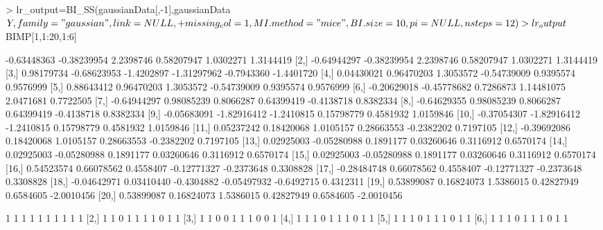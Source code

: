 \documentclass[a4paper]{article}
\begin{document}
\begin{Schunk}
\begin{Sinput}
> lr_output=BI_SS(gaussianData[,-1],gaussianData$Y,family="gaussian",link=NULL,
+                 missing_col=1,MI.method="mice",BI.size=10,pi=NULL,nsteps=12)
> lr_output$BIMP[1,1:20,1:6]
\end{Sinput}
\begin{Soutput}
             [,1]        [,2]       [,3]        [,4]       [,5]       [,6]
 [1,] -0.63448363 -0.38239954  2.2398746  0.58207947  1.0302271  1.3144419
 [2,] -0.64944297 -0.38239954  2.2398746  0.58207947  1.0302271  1.3144419
 [3,]  0.98179734 -0.68623953 -1.4202897 -1.31297962 -0.7943360 -1.4401720
 [4,]  0.04430021  0.96470203  1.3053572 -0.54739009  0.9395574  0.9576999
 [5,]  0.88643412  0.96470203  1.3053572 -0.54739009  0.9395574  0.9576999
 [6,] -0.20629018 -0.45778682  0.7286873  1.14481075  2.0471681  0.7722505
 [7,] -0.64944297  0.98085239  0.8066287  0.64399419 -0.4138718  0.8382334
 [8,] -0.64629355  0.98085239  0.8066287  0.64399419 -0.4138718  0.8382334
 [9,] -0.05683091 -1.82916412 -1.2410815  0.15798779  0.4581932  1.0159846
[10,] -0.37054307 -1.82916412 -1.2410815  0.15798779  0.4581932  1.0159846
[11,]  0.05237242  0.18420068  1.0105157  0.28663553 -0.2382202  0.7197105
[12,] -0.39692086  0.18420068  1.0105157  0.28663553 -0.2382202  0.7197105
[13,]  0.02925003 -0.05280988  0.1891177  0.03260646  0.3116912  0.6570174
[14,]  0.02925003 -0.05280988  0.1891177  0.03260646  0.3116912  0.6570174
[15,]  0.02925003 -0.05280988  0.1891177  0.03260646  0.3116912  0.6570174
[16,]  0.54523574  0.66078562  0.4558407 -0.12771327 -0.2373648  0.3308828
[17,] -0.28484748  0.66078562  0.4558407 -0.12771327 -0.2373648  0.3308828
[18,] -0.04642971  0.03410440 -0.4304882 -0.05497932 -0.6492715  0.4312311
[19,]  0.53899087  0.16824073  1.5386015  0.42827949  0.6584605 -2.0010456
[20,]  0.53899087  0.16824073  1.5386015  0.42827949  0.6584605 -2.0010456
\end{Soutput}
\begin{Soutput}
      [,1] [,2] [,3] [,4] [,5] [,6] [,7] [,8] [,9] [,10]
 [1,]    1    1    1    1    1    1    1    1    1     1
 [2,]    1    1    0    1    1    1    1    0    1     1
 [3,]    1    1    0    0    1    1    1    0    0     1
 [4,]    1    1    1    0    1    1    1    0    1     1
 [5,]    1    1    1    0    1    1    1    0    1     1
 [6,]    1    1    1    0    1    1    1    0    1     1

\end{Soutput}
\end{Schunk}
\end{document}
